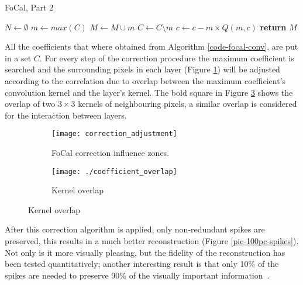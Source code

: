 \begin{algorithm}[htb]
  \caption{FoCal, Part 2}
  \label{code-focal-corr}
  \begin{algorithmic}
    \State $N \leftarrow \emptyset$ 
    \Repeat
    \State $m \leftarrow max(C)$
    \State $M \leftarrow M \cup m$
    \State $C \leftarrow C \setminus m$
     
     
    \State $c \leftarrow c - m \times Q(m, c)$
    \EndIf
    \EndFor
    \State \textbf{return} $M$
    \EndProcedure
  \end{algorithmic}
\end{algorithm}

All the coefficients that where obtained from Algorithm \ref{code-focal-conv}, are put in a set $C$. For every step of the correction procedure the maximum coefficient is searched and the surrounding pixels in each layer (Figure \ref{fig:focal2}) will be adjusted according to the correlation due to overlap between the maximum coefficient's convolution kernel and the layer's kernel. The bold square in Figure \ref{fig:overlap} shows the overlap of two $3\times3$ kernels of neighbouring pixels, a similar overlap is considered for the interaction between layers.

\begin{figure}[htb]
  \centering
  \begin{subfigure}[t]{0.68\textwidth}
  \texttt{[image: correction\_adjustment]}
  \caption{FoCal correction influence zones.}
  \label{fig:focal2}
  \end{subfigure}
  \hfill
  \begin{subfigure}[t]{0.29\textwidth}
  \texttt{[image: ./coefficient\_overlap]}
  \caption{Kernel overlap}
  \label{fig:overlap}
  \end{subfigure}
\end{figure}

After this correction algorithm is applied, only non-redundant spikes are preserved, this results in a much better reconstruction (Figure \ref{pic-100pc-spikes}). Not only is it more visually pleasing, but the fidelity of the reconstruction has been tested quantitatively; another interesting result is that only 10\% of the spikes are needed to preserve 90\% of the visually important information~\cite{basab-thesis}.

